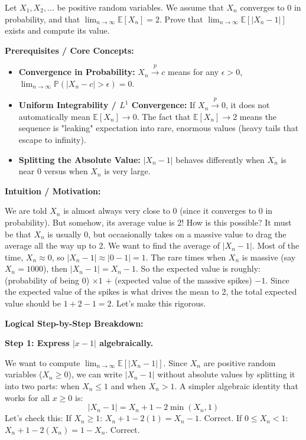 \begin{exercise}\label{probability:2017:6}
Let $X_1, X_2, \dots$ be positive random variables. We assume that $X_n$ converges to 0 in probability, and that $\lim_{n \to \infty} \mathbb{E}[X_n] = 2$. Prove that $\lim_{n \to \infty} \mathbb{E}[|X_n - 1|]$ exists and compute its value.
\end{exercise}

\begin{solution}
\textbf{Prerequisites / Core Concepts:}
\begin{itemize}
    \item \textbf{Convergence in Probability:} $X_n \xrightarrow{p} c$ means for any $\epsilon > 0$, $\lim_{n \to \infty} \mathbb{P}(|X_n - c| > \epsilon) = 0$.
    \item \textbf{Uniform Integrability / $L^1$ Convergence:} If $X_n \xrightarrow{p} 0$, it does not automatically mean $\mathbb{E}[X_n] \to 0$. The fact that $\mathbb{E}[X_n] \to 2$ means the sequence is "leaking" expectation into rare, enormous values (heavy tails that escape to infinity).
    \item \textbf{Splitting the Absolute Value:} $|X_n - 1|$ behaves differently when $X_n$ is near 0 versus when $X_n$ is very large.
\end{itemize}

\textbf{Intuition / Motivation:}

We are told $X_n$ is almost always very close to 0 (since it converges to 0 in probability). But somehow, its average value is 2! How is this possible? It must be that $X_n$ is usually 0, but occasionally takes on a massive value to drag the average all the way up to 2.
We want to find the average of $|X_n - 1|$. 
Most of the time, $X_n \approx 0$, so $|X_n - 1| \approx |0 - 1| = 1$.
The rare times when $X_n$ is massive (say $X_n = 1000$), then $|X_n - 1| = X_n - 1$.
So the expected value is roughly: (probability of being 0) $\times 1$ + (expected value of the massive spikes) $- 1$.
Since the expected value of the spikes is what drives the mean to 2, the total expected value should be $1 + 2 - 1 = 2$. Let's make this rigorous.

\textbf{Logical Step-by-Step Breakdown:}

\textbf{Step 1: Express $|x - 1|$ algebraically.}

We want to compute $\lim_{n \to \infty} \mathbb{E}[|X_n - 1|]$.
Since $X_n$ are positive random variables ($X_n \geq 0$), we can write $|X_n - 1|$ without absolute values by splitting it into two parts: when $X_n \leq 1$ and when $X_n > 1$.
A simpler algebraic identity that works for all $x \geq 0$ is:
\[ |X_n - 1| = X_n + 1 - 2\min(X_n, 1) \]
Let's check this:
If $X_n \geq 1$: $X_n + 1 - 2(1) = X_n - 1$. Correct.
If $0 \leq X_n < 1$: $X_n + 1 - 2(X_n) = 1 - X_n$. Correct.


\end{solution}
